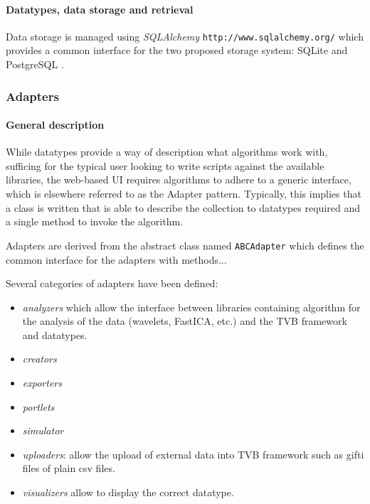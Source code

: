 
\paragraph{Datatypes, data storage and retrieval} 

Data storage is managed using \emph{SQLAlchemy}
\texttt{http://www.sqlalchemy.org/} which provides a common interface for the
two proposed storage system: SQLite and PostgreSQL .

\subsubsection{Adapters}

\paragraph{General description}

While datatypes provide a way of description what algorithms work with, 
sufficing for the typical user looking to write scripts against the
available libraries, the web-based UI requires algorithms to adhere to 
a generic interface, which is elsewhere referred to as the Adapter pattern.
Typically, this implies that a class is written that is able to describe
the collection to datatypes required and a single method to invoke the
algorithm.

Adapters are derived from the abstract class named \texttt{ABCAdapter} which
defines the common interface for the adapters with methods...

Several categories of adapters have been defined: 
\begin{itemize}
    \item \textit{analyzers} which allow the interface between libraries
        containing algorithm for the analysis of the data (wavelets, FastICA,
        etc.) and the TVB framework and datatypes.
    \item \textit{creators}
    \item \textit{exporters} 
    \item \textit{portlets} 
    \item \textit{simulator}
\item \textit{uploaders}: allow the upload of external data into TVB framework
    such as gifti files of plain csv files.
\item \textit{visualizers}  allow
    to display the correct datatype.
\end{itemize}


